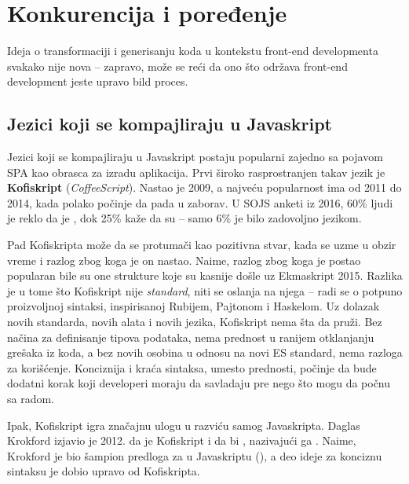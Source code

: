 \chapter{Konkurencija i poređenje}

Ideja o transformaciji i generisanju koda u kontekstu front-end developmenta svakako nije nova -- zapravo, može se reći da ono što održava front-end development jeste upravo bild proces.

\section{Jezici koji se kompajliraju u Javaskript}

Jezici koji se kompajliraju u Javaskript postaju popularni zajedno sa pojavom SPA kao obrasca za izradu aplikacija.
Prvi široko rasprostranjen takav jezik je \textbf{Kofiskript} (\textsl{CoffeeScript}). %
Nastao je 2009, a najveću popularnost ima od 2011 do 2014, kada polako počinje da pada u zaborav.
U SOJS anketi iz 2016, 60\% ljudi je reklo da je , dok 25\% kaže da su  -- samo 6\% je bilo zadovoljno jezikom.

Pad Kofiskripta može da se protumači kao pozitivna stvar, kada se uzme u obzir vreme i razlog zbog koga je on nastao.
Naime, razlog zbog koga je postao popularan bile su one strukture koje su kasnije došle uz Ekmaskript 2015.
Razlika je u tome što Kofiskript nije \textit{standard}, niti se oslanja na njega -- radi se o potpuno proizvoljnoj sintaksi, inspirisanoj Rubijem, Pajtonom i Haskelom.
Uz dolazak novih standarda, novih alata i novih jezika, Kofiskript nema šta da pruži.
Bez načina za definisanje tipova podataka, nema prednost u ranijem otklanjanju grešaka iz koda, a bez novih osobina u odnosu na novi ES standard, nema razloga za korišćenje.
Konciznija i kraća sintaksa, umesto prednosti, počinje da bude dodatni korak koji developeri moraju da savladaju pre nego što mogu da počnu sa radom. %

Ipak, Kofiskript igra značajnu ulogu u razviću samog Javaskripta.
Daglas Krokford izjavio je 2012. da je Kofiskript  i da bi , nazivajući ga . %
Naime, Krokford je bio šampion predloga za  u Javaskriptu (\code{=>}), a deo ideje za konciznu sintaksu je dobio upravo od Kofiskripta. %

